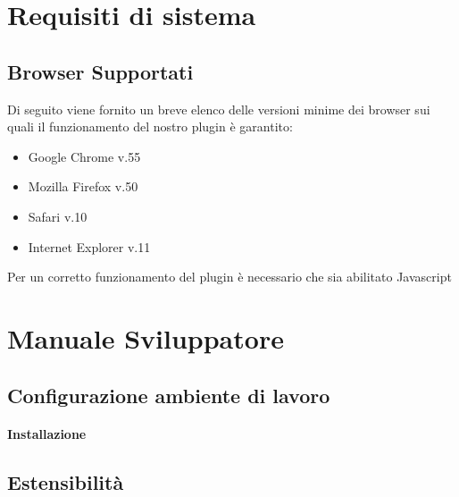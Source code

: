 \section{Requisiti di sistema}
\subsection{Browser Supportati}

Di seguito viene fornito un breve elenco delle versioni minime dei browser sui quali il funzionamento del nostro plugin è garantito:
\begin{itemize}
	
	\item Google Chrome v.55
	\item Mozilla Firefox v.50
	\item Safari v.10
	\item Internet Explorer v.11
	
\end{itemize}

Per un corretto funzionamento del plugin è necessario che sia abilitato Javascript




\section{Manuale Sviluppatore}
\subsection{Configurazione ambiente di lavoro}
\paragraph{Installazione}
\subsection{Estensibilità}











